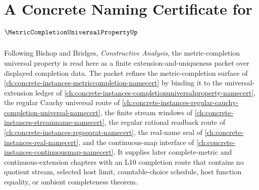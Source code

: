 \chapter{A Concrete Naming Certificate for $\MetricCompletionUniversalPropertyUp$}
\label{ch:concrete-instances-metric-completion-universal-property-namecert}

Following Bishop and Bridges, \emph{Constructive Analysis}, the metric-completion universal property is read here as a finite extension-and-uniqueness packet over displayed completion data. The packet refines the metric-completion surface of \autoref{ch:concrete-instances-metriccompletion-namecert} by binding it to the universal-extension ledger of \autoref{ch:concrete-instances-completionuniversalproperty-namecert}, the regular Cauchy universal route of \autoref{ch:concrete-instances-regular-cauchy-completion-universal-namecert}, the finite stream windows of \autoref{ch:concrete-instances-streamname-namecert}, the regular rational readback route of \autoref{ch:concrete-instances-regseqrat-namecert}, the real-name seal of \autoref{ch:concrete-instances-real-namecert}, and the continuous-map interface of \autoref{ch:concrete-instances-continuousmap-namecert}. It supplies later complete-metric and continuous-extension chapters with an L10 completion route that contains no quotient stream, selected host limit, countable-choice schedule, host function equality, or ambient completeness theorem.

